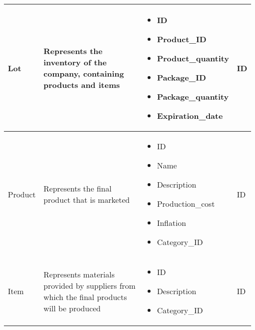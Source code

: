 \begin{longtable}{|p{}|p{} |p{}|p{} |}
    Lot & Represents the inventory of the company, containing products and items &
    \begin{itemize}
        \vspace{-1em}
        \item ID
        \item Product\_ID
        \item Product\_quantity
        \item Package\_ID
        \item Package\_quantity
        \item Expiration\_date
    \end{itemize}
    &  ID \\\hline


    Product & Represents the final product that is marketed &
    \begin{itemize}
        \vspace{-1em}
        \item ID
        \item Name
        \item Description           %
        \item Production\_cost      %
        \item Inflation             %
        \item Category\_ID
    \end{itemize}
    &  ID \\\hline

    Item & Represents materials provided by suppliers from which the final products will be produced &
    \begin{itemize}
        \vspace{-1em}
        \item ID
        \item Description
        \item Category\_ID
    \end{itemize}
    &  ID \\\hline


\end{longtable}
